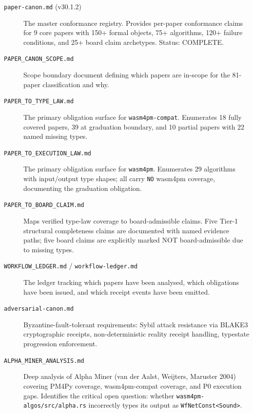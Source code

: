 \begin{description}
  \item[\texttt{paper-canon.md} (v30.1.2)] The master conformance registry.
    Provides per-paper conformance claims for 9 core papers with 150+ formal
    objects, 75+ algorithms, 120+ failure conditions, and 25+ board claim
    archetypes. Status: COMPLETE.

  \item[\texttt{PAPER\_CANON\_SCOPE.md}] Scope boundary document defining
    which papers are in-scope for the 81-paper classification and why.

  \item[\texttt{PAPER\_TO\_TYPE\_LAW.md}] The primary obligation surface for
    \texttt{wasm4pm-compat}. Enumerates 18 fully covered papers, 39 at
    graduation boundary, and 10 partial papers with 22 named missing types.

  \item[\texttt{PAPER\_TO\_EXECUTION\_LAW.md}] The primary obligation surface
    for \texttt{wasm4pm}. Enumerates 29 algorithms with input/output type
    shapes; all carry \texttt{NO} wasm4pm coverage, documenting the graduation
    obligation.

  \item[\texttt{PAPER\_TO\_BOARD\_CLAIM.md}] Maps verified type-law coverage
    to board-admissible claims. Five Tier-1 structural completeness claims are
    documented with named evidence paths; five board claims are explicitly
    marked NOT board-admissible due to missing types.

  \item[\texttt{WORKFLOW\_LEDGER.md} / \texttt{workflow-ledger.md}] The
    ledger tracking which papers have been analysed, which obligations have
    been issued, and which receipt events have been emitted.

  \item[\texttt{adversarial-canon.md}] Byzantine-fault-tolerant requirements:
    Sybil attack resistance via BLAKE3 cryptographic receipts, non-deterministic
    reality receipt handling, typestate progression enforcement.

  \item[\texttt{ALPHA\_MINER\_ANALYSIS.md}] Deep analysis of Alpha Miner
    (van der Aalst, Weijters, Maruster 2004) covering PM4Py coverage,
    wasm4pm-compat coverage, and P0 execution gaps. Identifies the critical
    open question: whether \texttt{wasm4pm-algos/src/alpha.rs} incorrectly
    types its output as \texttt{WfNetConst<Sound>}.


\end{description}
